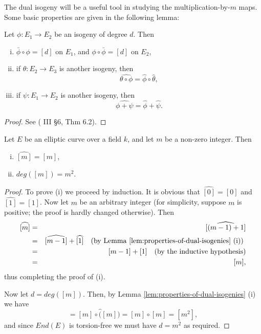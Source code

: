 The dual isogeny will be a useful tool in studying the multiplication-by-$m$ maps.
Some basic properties are given in the following lemma:
\begin{lem}
  \label{lem:properties-of-dual-isogenies}
  Let $\phi \colon E_{1} \rightarrow E_{2}$ be an isogeny of degree $d$.  Then
  \begin{enumerate}[(i)]
  \item $\bar{\phi} \circ \phi = \left[ d \right]$ on $E_{1}$, and $\phi \circ
    \bar{\phi} = \left[ d \right]$ on $E_{2}$,
  \item if $\theta \colon E_{2} \rightarrow E_{3}$ is another isogeny, then
    \begin{equation*}
      \widehat{\theta \circ \phi} = \hat{\phi} \circ \hat{\theta},
    \end{equation*}
  \item if $\psi \colon E_{1} \rightarrow E_{2}$ is another isogeny, then
    \begin{equation*}
      \widehat{\phi + \psi} = \hat{\phi} + \hat{\psi}.
    \end{equation*}
  \end{enumerate}
\end{lem}
\begin{proof}
  See (\cite{silverman86} III \S 6, Thm 6.2).
\end{proof}

\begin{prop}
  \label{prop:properties-of-m-dual}
  Let $E$ be an elliptic curve over a field $k$, and let $m$ be a non-zero integer.
  Then
  \begin{enumerate}[(i)]
  \item $\widehat{[m]} = [m]$,
  \item $deg([m]) = m^{2}$.
  \end{enumerate}
\end{prop}

\begin{proof}
  To prove (i) we proceed by induction.  It is obvious that $\widehat{[0]} = [0]$ and
  $\widehat{[1]} = [1]$.  Now let $m$ be an arbitrary integer (for simplicity, suppose
  $m$ is positive; the proof is hardly changed otherwise). Then
  \begin{eqnarray*}
    \widehat{[m]}&=&\widehat{[(m-1) + 1]}\\
    &=&\widehat{[m-1]} + \widehat{[1]} \quad \text{(by Lemma
                                 \ref{lem:properties-of-dual-isogenies} (i)) }\\
    &=&[m-1] + [1] \quad \text{(by the inductive hypothesis)}\\
    &=&[m],
  \end{eqnarray*}
  thus completing the proof of (i).

  Now let $d = deg([m])$.  Then, by Lemma \ref{lem:properties-of-dual-isogenies} (i)
  we have
  \begin{equation*}
    [d] = [m] \circ \widehat([m]) = [m] \circ [m] = [m^{2}],
  \end{equation*}
  and since $End(E)$ is torsion-free we must have $d = m^{2}$ as required.
\end{proof}

